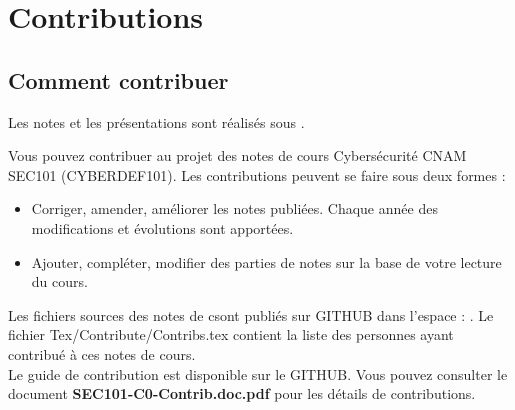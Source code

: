 
\section{Contributions}

\subsection{Comment contribuer}

Les notes et les présentations sont réalisés sous . 

Vous pouvez contribuer au projet des notes de cours Cybersécurité CNAM SEC101 (CYBERDEF101). Les contributions peuvent se faire sous deux formes :

\begin{itemize}
  \item Corriger, amender, améliorer les notes publiées. Chaque année des modifications et évolutions sont apportées.
  \item Ajouter, compléter, modifier des parties de notes sur la base de votre lecture du cours.
\end{itemize}

 Les fichiers sources des notes de c\ecours sont publiés sur GITHUB dans l'espace : . 
 Le fichier Tex/Contribute/Contribs.tex contient la liste des personnes ayant contribué à ces notes de cours.
 \\Le guide de contribution est disponible sur le GITHUB.
Vous pouvez consulter le document \textbf{SEC101-C0-Contrib.doc.pdf} pour les détails de contributions.
